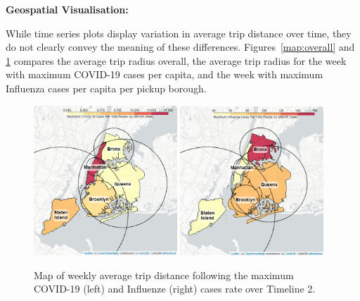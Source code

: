 \documentclass[11pt]{article}
\begin{document}



\textbf{Geospatial Visualisation:}    

While time series plots display variation in average trip distance over time, 
they do not clearly convey the meaning of these differences.
Figures~\ref{map:overall} and \ref{maps} compares the average trip radius overall, 
the average trip radius for the week with maximum COVID-19 cases per capita, 
and the week with maximum Influenza cases per capita per pickup borough.



\begin{figure}[H]

    \centering

    \includegraphics[width=0.48\textwidth]{../plots/cropped-map-avg-trip-distance-at-max-covid-by-pu_borough.png}
    \includegraphics[width=0.48\textwidth]{../plots/cropped-map-avg-trip-distance-at-max-flu-by-pu_borough.png}

    \caption{Map of weekly average trip distance following the maximum COVID-19 (left) and Influenze (right) cases rate over Timeline 2.} %
    \label{maps}
\end{figure}
\end{document}
